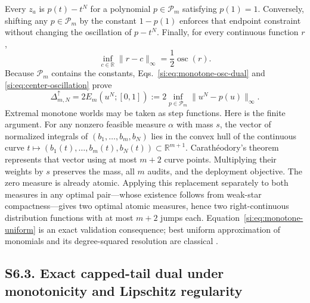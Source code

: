 \documentclass[10pt,twocolumn]{article}
\newcommand{\cP}{\mathcal P}
\begin{document}
Every $z_a$ is $p(t)-t^N$ for a polynomial $p\in\cP_m$ satisfying $p(1)=1$. Conversely, shifting any $p\in\cP_m$ by the constant $1-p(1)$ enforces that endpoint constraint without changing the oscillation of $p-t^N$. Finally, for every continuous function $r$,
\begin{equation}
\inf_{c\in\mathbb R}\|r-c\|_\infty
=\frac12\operatorname{osc}(r).
\label{si:eq:center-oscillation}
\end{equation}
Because $\cP_m$ contains the constants, Eqs.~\ref{si:eq:monotone-osc-dual} and \ref{si:eq:center-oscillation} prove
\begin{equation}
\boxed{\Delta^\uparrow_{m,N}
=2E_m(u^N;[0,1])
:=2\inf_{p\in\cP_m}\|u^N-p(u)\|_\infty.}
\label{si:eq:monotone-uniform}
\end{equation}
Extremal monotone worlds may be taken as step functions. Here is the finite
argument. For any nonzero feasible measure $\alpha$ with mass $s$, the vector
of normalized integrals of $(b_1,\ldots,b_m,b_N)$ lies in the convex hull of
the continuous curve $t\mapsto(b_1(t),\ldots,b_m(t),b_N(t))\subset\mathbb R^{m+1}$.
Carath\'eodory's theorem represents that vector using at most $m+2$ curve
points. Multiplying their weights by $s$ preserves the mass, all $m$ audits,
and the deployment objective. The zero measure is already atomic. Applying
this replacement separately to both measures in any optimal pair---whose
existence follows from weak-star compactness---gives two optimal atomic
measures, hence two right-continuous distribution functions with at most
$m+2$ jumps each. Equation~\ref{si:eq:monotone-uniform} is an exact validation consequence; best uniform approximation of monomials and its degree-squared resolution are classical \citep[main result, pp.~451--455]{newman1976}.

\subsection*{S6.3. Exact capped-tail dual under monotonicity and Lipschitz regularity}
\end{document}
